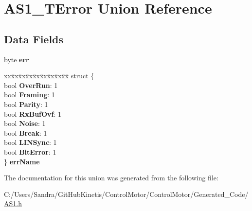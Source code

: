 \hypertarget{union_a_s1___t_error}{}\section{A\+S1\+\_\+\+T\+Error Union Reference}
\label{union_a_s1___t_error}
\subsection*{Data Fields}
\begin{DoxyCompactItemize}
\item 
byte {\bfseries err}\hypertarget{union_a_s1___t_error_a21083988a9d8912f03d8c4ebbefa1698}{}\label{union_a_s1___t_error_a21083988a9d8912f03d8c4ebbefa1698}

\item 
\begin{tabbing}
xx\=xx\=xx\=xx\=xx\=xx\=xx\=xx\=xx\=\kill
struct \{\\
\>bool {\bfseries OverRun}: 1\\
\>bool {\bfseries Framing}: 1\\
\>bool {\bfseries Parity}: 1\\
\>bool {\bfseries RxBufOvf}: 1\\
\>bool {\bfseries Noise}: 1\\
\>bool {\bfseries Break}: 1\\
\>bool {\bfseries LINSync}: 1\\
\>bool {\bfseries BitError}: 1\\
\} {\bfseries errName}\hypertarget{union_a_s1___t_error_aae740eb042e1459ae920829ef3a3c610}{}\label{union_a_s1___t_error_aae740eb042e1459ae920829ef3a3c610}
\\

\end{tabbing}\end{DoxyCompactItemize}


The documentation for this union was generated from the following file\+:\begin{DoxyCompactItemize}
\item 
C\+:/\+Users/\+Sandra/\+Git\+Hub\+Kinetis/\+Control\+Motor/\+Control\+Motor/\+Generated\+\_\+\+Code/\hyperlink{_a_s1_8h}{A\+S1.\+h}\end{DoxyCompactItemize}
